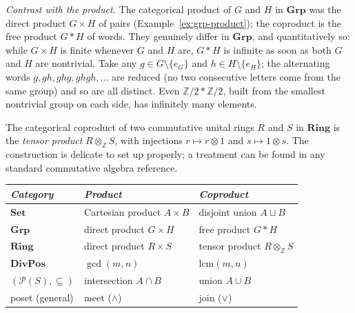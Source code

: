\begin{example}
\textit{Contrast with the product.} The categorical product of
$G$ and $H$ in $\mathbf{Grp}$ was the direct product
$G \times H$ of pairs (Example~\ref{ex:grp-product}); the
coproduct is the free product $G * H$ of words. They genuinely
differ in $\mathbf{Grp}$, and quantitatively so: while
$G \times H$ is finite whenever $G$ and $H$ are, $G * H$ is
infinite as soon as both $G$ and $H$ are nontrivial. Take any
$g \in G \setminus \{e_G\}$ and $h \in H \setminus \{e_H\}$;
the alternating words $g, gh, ghg, ghgh, \ldots$ are reduced
(no two consecutive letters come from the same group) and so
are all distinct. Even $\mathbb{Z}/2 * \mathbb{Z}/2$, built
from the smallest nontrivial group on each side, has infinitely
many elements.
\end{example}

\begin{example}\label{ex:ring-coproduct}
The categorical coproduct of two commutative unital rings $R$
and $S$ in $\mathbf{Ring}$ is the \textit{tensor
product} $R \otimes_{\mathbb{Z}} S$, with
injections $r \mapsto r \otimes 1$ and
$s \mapsto 1 \otimes s$. The construction is delicate to set
up properly; a treatment can be found in any standard
commutative algebra reference.
\end{example}

\begin{remark}\label{rem:duality-cheat-sheet}
\begin{center}
\begin{tabular}{lll}
\hline
\textit{Category} & \textit{Product} & \textit{Coproduct} \\
\hline
$\mathbf{Set}$ & Cartesian product $A \times B$ & disjoint union $A \sqcup B$ \\
$\mathbf{Grp}$ & direct product $G \times H$ & free product $G * H$ \\
$\mathbf{Ring}$ & direct product $R \times S$ & tensor product $R \otimes_{\mathbb{Z}} S$ \\
$\mathbf{DivPos}$ & $\gcd(m, n)$ & $\mathrm{lcm}(m, n)$ \\
$(\mathcal{P}(S), \subseteq)$ & intersection $A \cap B$ & union $A \cup B$ \\
poset (general) & meet ($\wedge$) & join ($\vee$) \\
\hline
\end{tabular}
\end{center}
\end{remark}

